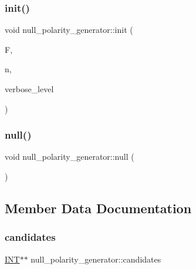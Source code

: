 \mbox{\label{classnull__polarity__generator_acb3572953351234f30a9a73debb27646}} 
\subsubsection{\texorpdfstring{init()}{init()}}
{\footnotesize\ttfamily void null\+\_\+polarity\+\_\+generator\+::init (\begin{DoxyParamCaption}\item[{\mbox{\hyperlink{classfinite__field}{finite\+\_\+field}} $\ast$}]{F,  }\item[{\mbox{\hyperlink{galois_8h_a09fddde158a3a20bd2dcadb609de11dc}{I\+NT}}}]{n,  }\item[{\mbox{\hyperlink{galois_8h_a09fddde158a3a20bd2dcadb609de11dc}{I\+NT}}}]{verbose\+\_\+level }\end{DoxyParamCaption})}

\mbox{\label{classnull__polarity__generator_a456ee9ba58f5e8788bedc6232dc3cc75}} 
\subsubsection{\texorpdfstring{null()}{null()}}
{\footnotesize\ttfamily void null\+\_\+polarity\+\_\+generator\+::null (\begin{DoxyParamCaption}{ }\end{DoxyParamCaption})}



\subsection{Member Data Documentation}
\mbox{\label{classnull__polarity__generator_ab7395285a4a2ff422c08f0bf7618c740}} 
\subsubsection{\texorpdfstring{candidates}{candidates}}
{\footnotesize\ttfamily \mbox{\hyperlink{galois_8h_a09fddde158a3a20bd2dcadb609de11dc}{I\+NT}}$\ast$$\ast$ null\+\_\+polarity\+\_\+generator\+::candidates}

